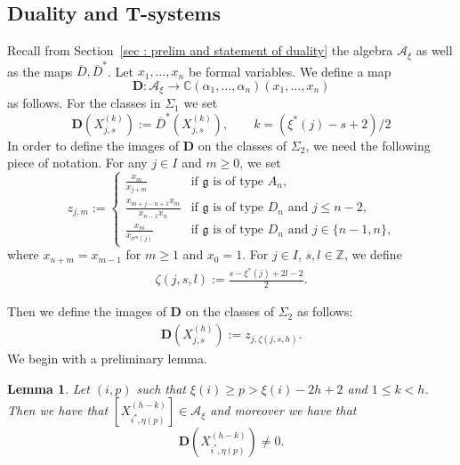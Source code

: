 \documentclass[12pt]{amsart}
\theoremstyle{plain}
\newtheorem{lemma}[theorem]{Lemma}
\theoremstyle{definition}
\numberwithin{equation}{section}
\newcommand{\ZZ}{{\mathbb {Z}}}
\newcommand{\barD}{\overline{D}}
\newcommand{\barDstar}{\overline{D}^{*}}
\newcommand{\xistar}{\xi^{*}}
\begin{document}
\subsection{Duality and T-systems}
\label{sec : duality and T systems}
 
 
 Recall from Section~\ref{sec : prelim and statement of duality} the algebra $\mathcal{A}_{\xi}$ as well as the maps $\barD, \barDstar$. Let $x_1, \ldots , x_n$ be formal variables.
 We define a map 
 $$ \mathbf{D} : \mathcal{A}_{\xi} \longrightarrow \mathbb{C}(\alpha_1, \ldots , \alpha_n)(x_1, \ldots , x_n) $$
 as follows. For the classes in $\Sigma_1$  we set 
 $$ \mathbf{D}(X_{j,s}^{(k)}) :=  \barDstar  \left( X_{j , s}^{(k)} \right), \qquad k = (\xistar(j)-s+2)/2 $$
 In order to define the images of $\mathbf{D}$ on the classes of $\Sigma_2$, we need the following piece of notation. For any $j \in I$ and $m \geq 0$, we set 
 $$ z_{j,m} := 
\begin{cases}
    \frac{x_m}{x_{j+m}} & \text{if $\mathfrak{g}$ is of type $A_n$,} \\
    \frac{x_{m+j-n+1}x_m}{x_{n-1}x_n} & \text{if $\mathfrak{g}$ is of type $D_n$ and $j \leq n-2$,} \\
    \frac{x_m}{x_{\sigma^m(j)}} & \text{if $\mathfrak{g}$ is of type $D_n$ and $j \in \{n-1,n\}$,}
    \end{cases}
 $$
where $x_{n+m}=x_{m-1}$ for $m \ge 1$ and $x_0=1$. For $j \in I$, $s, l \in \ZZ$, we define
\begin{align} \label{eq:definition of zeta jsh}
\zeta(j,s,l) := \frac{s-\xistar(j)+2l-2}{2}.
\end{align}
 
 Then we define the images of $\mathbf{D}$ on the classes of $\Sigma_2$ as follows:
 \begin{align} \label{eq:definition of D of Xjsh}
    \mathbf{D}(X_{j,s}^{(h)}) := z_{j,\zeta(j,s,h)}.
 \end{align} 
We begin with a preliminary lemma. 


\begin{lemma} \label{lem : boldD not zero}
Let $(i,p)$ such that $\xi(i) \geq p > \xi(i)-2h+2$ and $1 \leq k<h$. Then we have that $[X_{i^{*} , \eta(p)}^{(h-k)}] \in \mathcal{A}_{\xi}$ and moreover we have that 
$$  \mathbf{D} \left( X_{i^{*} , \eta(p)}^{(h-k)} \right) \neq 0   %
.  $$
\end{lemma}
\end{document}

